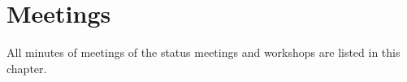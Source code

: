 \documentclass[hsr-ba,english]{hgbthesis}
\begin{document}





\chapter{Meetings}

All minutes of meetings of the status meetings and workshops are listed in
this chapter.




%
%



\printglossaries


\MakeBibliography
\end{document}
